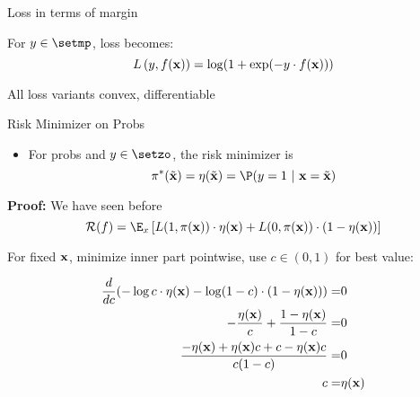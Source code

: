 \documentclass[11pt,compress,t,notes=noshow, xcolor=table]{beamer}
\begin{document}
\begin{framei}[sep=M]{Loss in terms of margin}

\item For $y \in \setmp$, loss becomes: 
$$
  L\left(y, f(\mathbf{x})\right) = \log(1+\exp(-y \cdot f(\mathbf{x}))) 
$$
 
\item All loss variants convex, differentiable

 \vfill



\end{framei}


\begin{frame}{Risk Minimizer on Probs}

\begin{itemize}
    \item For probs and $y \in \setzo$, the risk minimizer is
$$
  \piastxtil = \eta(\xtil) = \P(y = 1 ~|~ \xv = \xtil) 
$$
\end{itemize}


\textbf{Proof:} We have seen before
$$
  \riskf = \E_x \left[L(1, \pix) \cdot \eta(\xv) + L(0, \pix) \cdot (1 - \eta(\xv)) \right]
$$

For fixed $\mathbf{x}$, minimize inner part pointwise, use $c\in(0,1)$ for best value:

{\footnotesize
\begin{align*}
  \frac{d }{d c} (- \log c  \cdot \eta(\mathbf{x})- \log (1 - c) \cdot (1 - \eta(\mathbf{x}))) =& 0 \\
  - \frac{\eta(\mathbf{x})}{c} + \frac{1 - \eta(\mathbf{x})}{1 - c} =& 0 \\
  \frac{- \eta(\mathbf{x}) + \eta(\mathbf{x}) c + c - \eta(\mathbf{x}) c}{c (1 - c)} =& 0 \\
  c =& \eta(\mathbf{x})
\end{align*}
}

\end{frame}
\end{document}
